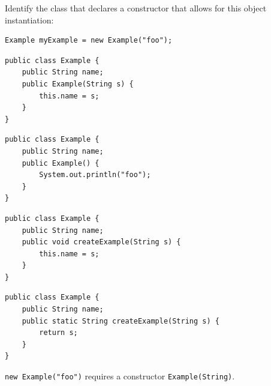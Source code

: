\question[4]
Identify the class that declares a constructor that allows for this object instantiation:
\begin{lstlisting}[style=java]
Example myExample = new Example("foo");
\end{lstlisting}
\begin{choices}
  \CorrectChoice
  \begin{minipage}[t]{0.88\linewidth}
\begin{lstlisting}[style=java]
public class Example {
    public String name;
    public Example(String s) {
        this.name = s;
    }
}
\end{lstlisting}
  \end{minipage}
  \choice
  \begin{minipage}[t]{0.88\linewidth}
\begin{lstlisting}[style=java]
public class Example {
    public String name;
    public Example() {
        System.out.println("foo");
    }
}
\end{lstlisting}
  \end{minipage}
  \choice
  \begin{minipage}[t]{0.88\linewidth}
\begin{lstlisting}[style=java]
public class Example {
    public String name;
    public void createExample(String s) {
        this.name = s;
    }
}
\end{lstlisting}
  \end{minipage}
  \choice
  \begin{minipage}[t]{0.88\linewidth}
\begin{lstlisting}[style=java]
public class Example {
    public String name;
    public static String createExample(String s) {
        return s;
    }
}
\end{lstlisting}
  \end{minipage}
\end{choices}
\begin{solution}
  \texttt{new Example("foo")} requires a constructor \texttt{Example(String)}.
\end{solution}

\newpage

